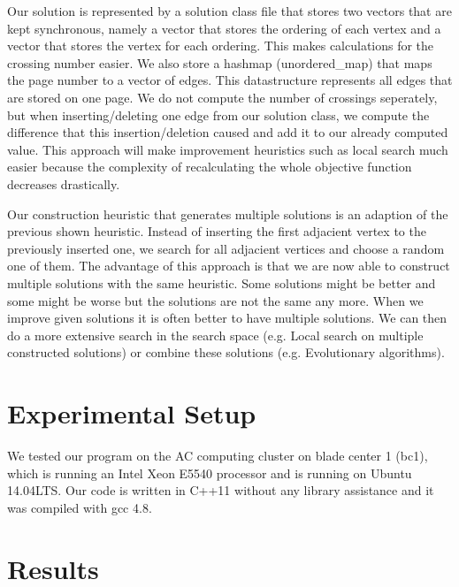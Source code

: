 \documentclass[11pt]{article}
\begin{document}
Our solution is represented by a solution class file that stores two vectors that are kept synchronous, namely a vector that stores the ordering of each vertex and a vector that stores the vertex for each ordering.
This makes calculations for the crossing number easier.
We also store a hashmap (unordered\_map) that maps the page number to a vector of edges. 
This datastructure represents all edges that are stored on one page.
We do not compute the number of crossings seperately, but when inserting/deleting one edge from our solution class, we compute the difference that this insertion/deletion caused and add it to our already computed value.
This approach will make improvement heuristics such as local search much easier because the complexity of recalculating the whole objective function decreases drastically.

Our construction heuristic that generates multiple solutions is an adaption of the previous shown heuristic.
Instead of inserting the first adjacient vertex to the previously inserted one, we search for all adjacient vertices and choose a random one of them.
The advantage of this approach is that we are now able to construct multiple solutions with the same heuristic.
Some solutions might be better and some might be worse but the solutions are not the same any more.
When we improve given solutions it is often better to have multiple solutions.
We can then do a more extensive search in the search space (e.g. Local search on multiple constructed solutions) or combine these solutions (e.g. Evolutionary algorithms).

\section{Experimental Setup}
We tested our program on the AC computing cluster on blade center 1 (bc1), which is running an Intel Xeon E5540 processor and is running on Ubuntu 14.04LTS.
Our code is written in C++11 without any library assistance and it was compiled with gcc 4.8.

\newpage
\section{Results}
\end{document}
